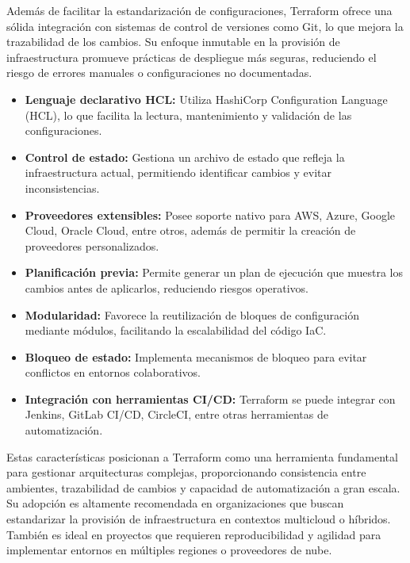 {            Además de facilitar la estandarización de configuraciones, Terraform ofrece una sólida integración con sistemas de control de versiones como Git, lo que mejora la trazabilidad de los cambios. Su enfoque inmutable en la provisión de infraestructura promueve prácticas de despliegue más seguras, reduciendo el riesgo de errores manuales o configuraciones no documentadas.
            
            \begin{itemize}
                \item \textbf{Lenguaje declarativo HCL:} Utiliza HashiCorp Configuration Language (HCL), lo que facilita la lectura, mantenimiento y validación de las configuraciones.
                \item \textbf{Control de estado:} Gestiona un archivo de estado que refleja la infraestructura actual, permitiendo identificar cambios y evitar inconsistencias.
                \item \textbf{Proveedores extensibles:} Posee soporte nativo para AWS, Azure, Google Cloud, Oracle Cloud, entre otros, además de permitir la creación de proveedores personalizados.
                \item \textbf{Planificación previa:} Permite generar un plan de ejecución que muestra los cambios antes de aplicarlos, reduciendo riesgos operativos.
                \item \textbf{Modularidad:} Favorece la reutilización de bloques de configuración mediante módulos, facilitando la escalabilidad del código IaC.
                \item \textbf{Bloqueo de estado:} Implementa mecanismos de bloqueo para evitar conflictos en entornos colaborativos.
                \item \textbf{Integración con herramientas CI/CD:} Terraform se puede integrar con Jenkins, GitLab CI/CD, CircleCI, entre otras herramientas de automatización.
            \end{itemize}
                
            Estas características posicionan a Terraform como una herramienta fundamental para gestionar arquitecturas complejas, proporcionando consistencia entre ambientes, trazabilidad de cambios y capacidad de automatización a gran escala. Su adopción es altamente recomendada en organizaciones que buscan estandarizar la provisión de infraestructura en contextos multicloud o híbridos. También es ideal en proyectos que requieren reproducibilidad y agilidad para implementar entornos en múltiples regiones o proveedores de nube.
                
}
